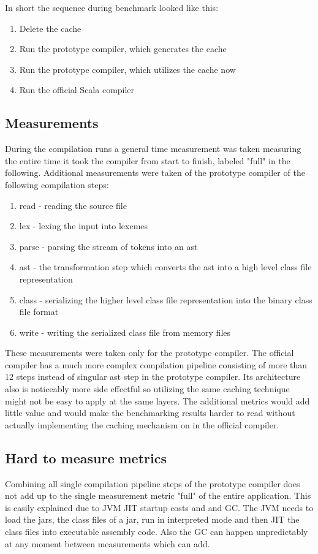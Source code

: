\documentclass{VUMIFPSbakalaurinis}
\begin{document}
In short the sequence during benchmark looked like this:

\begin{enumerate}
\item{Delete the cache}
\item{Run the prototype compiler, which generates the cache}
\item{Run the prototype compiler, which utilizes the cache now}
\item{Run the official Scala compiler}
\end{enumerate}

\subsection{Measurements}

During the compilation runs a general time measurement was taken measuring the entire time it took the compiler from start to finish, labeled "full" in the following.
Additional measurements were taken of the prototype compiler of the following compilation steps:

\begin{enumerate}
\item{read - reading the source file}
\item{lex - lexing the input into lexemes}
\item{parse - parsing the stream of tokens into an ast}
\item{ast - the transformation step which converts the ast into a high level class file representation}
\item{class - serializing the higher level class file representation into the binary class file format}
\item{write - writing the serialized class file from memory files}
\end{enumerate}

These measurements were taken only for the prototype compiler.
The official compiler has a much more complex compilation pipeline consisting of more than 12 steps instead of singular ast step in the prototype compiler.
Its architecture also is noticeably more side effectful so utilizing the same caching technique might not be easy to apply at the same layers.
The additional metrics would add little value and would make the benchmarking results harder to read without actually implementing the caching mechanism on in the official compiler.

\subsection{Hard to measure metrics}
Combining all single compilation pipeline steps of the prototype compiler does not add up to the single measurement metric "full" of the entire application.
This is easily explained due to JVM JIT startup costs and and GC.
The JVM needs to load the jars, the class files of a jar, run in interpreted mode and then JIT the class files into executable assembly code.
Also the GC can happen unpredictably at any moment between measurements which can add.
\end{document}
